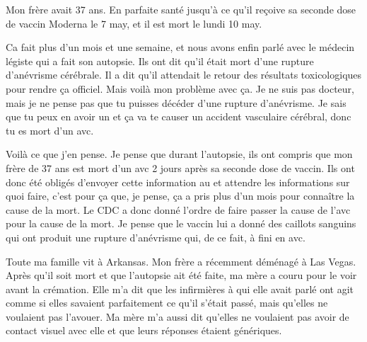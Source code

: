 Mon frère avait 37 ans. En parfaite santé jusqu'à ce qu'il reçoive sa seconde
dose de vaccin Moderna le 7 may, et il est mort le lundi 10 may.

Ca fait plus d'un mois et une semaine, et nous avons enfin parlé avec le médecin
légiste qui a fait son autopsie. Ils ont dit qu'il était mort d'une rupture
d'anévrisme cérébrale. Il a dit qu'il attendait le retour des résultats
toxicologiques pour rendre ça officiel. Mais voilà mon problème avec ça. Je ne
suis pas docteur, mais je ne pense pas que tu puisses décéder d'une rupture
d'anévrisme. Je sais que tu peux en avoir un et ça va te causer un accident
vasculaire cérébral, donc tu es mort d'un avc.

Voilà ce que j'en pense. Je pense que durant l'autopsie, ils ont compris que mon
frère de 37 ans est mort d'un avc 2 jours après sa seconde dose de vaccin. Ils
ont donc été obligés d'envoyer cette information au  et
attendre les informations sur quoi faire, c'est pour ça que, je pense, ça a pris
plus d'un mois pour connaître la cause de la mort. Le CDC a donc donné l'ordre
de faire passer la cause de l'avc pour la cause de la mort. Je pense que le
vaccin lui a donné des caillots sanguins qui ont produit une rupture d'anévrisme
qui, de ce fait, à fini en avc.

Toute ma famille vit à Arkansas. Mon frère a récemment déménagé à Las
Vegas. Après qu'il soit mort et que l'autopsie ait été faite, ma mère a couru
pour le voir avant la crémation. Elle m'a dit que les infirmières à qui elle
avait parlé ont agit comme si elles savaient parfaitement ce qu'il s'était
passé, mais qu'elles ne voulaient pas l'avouer. Ma mère m'a aussi dit qu'elles
ne voulaient pas avoir de contact visuel avec elle et que leurs réponses étaient
génériques.


